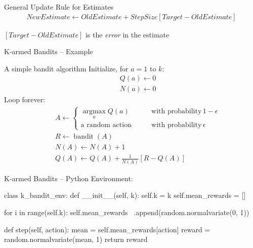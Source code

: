 \documentclass[ignorenonframetext,xcolor=x11names]{beamer}
\begin{document}
\begin{frame}[label=full]{General Update Rule for Estimates}
\begin{align*}
NewEstimate \leftarrow OldEstimate + StepSize \left[ Target - OldEstimate \right]
\end{align*}

\vspace{\baselineskip}
$\left[ Target - OldEstimate \right]$ is the \emph{error} in the estimate
\end{frame}

\begin{frame}[label=full]{K-armed Bandits -- Example}
\begin{block}{A simple bandit algorithm}
Initialize, for $a=1$ to $k$:
\begin{align*}
&\quad Q(a) \leftarrow 0 \\
&\quad N(a) \leftarrow 0
\end{align*}
Loop forever:
\begin{align*}
&\quad A \leftarrow \begin{cases} \operatorname*{arg max}_a Q(a) &\qquad \text{with probability}\, 1-\epsilon \\
\text{a random action} &\qquad \text{with probability}
\, \epsilon
\end{cases} \\
&\quad R \leftarrow \operatorname{bandit}(A) \\
&\quad N(A) \leftarrow N(A) + 1 \\
&\quad Q(A) \leftarrow Q(A) + \frac{1}{N(A)} \left[ R - Q(A) \right]
\end{align*}
\end{block}
\end{frame}

\begin{frame}[label=withcode,fragile]{K-armed Bandits -- Python}
Environment:
\begin{pythoncode}
class k_bandit_env:
    def __init__(self, k):
        self.k = k
        self.mean_rewards = []

        for i in range(self.k):
            self.mean_rewards \
                .append(random.normalvariate(0, 1))

    def step(self, action):
        mean = self.mean_rewards[action]
        reward = random.normalvariate(mean, 1)
        return reward
\end{pythoncode}
\end{frame}
\end{document}
